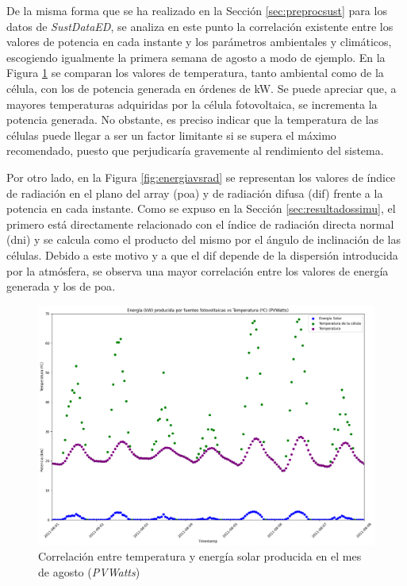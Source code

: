 \vspace{3mm}

De la misma forma que se ha realizado en la Sección \ref{sec:preprocsust} para los datos de \textit{SustDataED}, se analiza en este punto la correlación existente entre los valores de potencia en cada instante y los parámetros ambientales y climáticos, escogiendo igualmente la primera semana de agosto a modo de ejemplo. En la Figura \ref{fig:energiavstempcel} se comparan los valores de temperatura, tanto ambiental como de la célula, con los de potencia generada en órdenes de kW. Se puede apreciar que, a mayores temperaturas adquiridas por la célula fotovoltaica, se incrementa la potencia generada. No obstante, es preciso indicar que la temperatura de las células puede llegar a ser un factor limitante si se supera el máximo recomendado, puesto que perjudicaría gravemente al rendimiento del sistema.

\vspace{3mm}

Por otro lado, en la Figura \ref{fig:energiavsrad} se representan los valores de índice de radiación en el plano del array (\gls{poa}) y de radiación difusa (\gls{dif}) frente a la potencia en cada instante. Como se expuso en la Sección \ref{sec:resultadossimu}, el primero está directamente relacionado con el índice de radiación directa normal (\gls{dni}) y se calcula como el producto del mismo por el ángulo de inclinación de las células. Debido a este motivo y a que el \gls{dif} depende de la dispersión introducida por la atmósfera, se observa una mayor correlación entre los valores de energía generada y los de \gls{poa}.

\vspace{3mm}

\begin{figure}[H]
  \centering
  \includegraphics[width=1\textwidth]{img/diseno/energiavstempcel.png}
  \caption{Correlación entre temperatura y energía solar producida en el mes de agosto (\textit{PVWatts})}
  \label{fig:energiavstempcel}
\end{figure}

